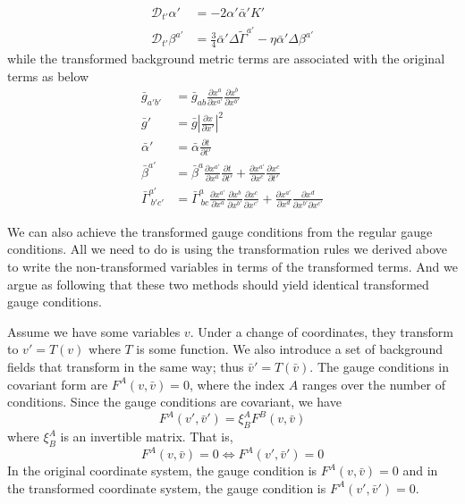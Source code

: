 \documentclass[letterpaper,nofootinbib,prd,amsmath,onecolumn]{revtex4-1}
\begin{document}
\begin{align*}
\mathscr{D}_{t'}\alpha' & = -2\alpha'{\bar \alpha}'K'\\
\mathscr{D}_{t'}\beta^{a'} & = \frac{3}{4}{\bar \alpha}'\Delta {\tilde \Gamma}^{a'} - \eta {\bar \alpha}'\Delta\beta^{a'}
\end{align*}
while the transformed background metric terms are associated with the original terms as below
\begin{align}
{\bar g}_{a'b'} & = {\bar g}_{ab}\frac{\partial x^{a}}{\partial x^{a'}}\frac{\partial x^{b}}{\partial x^{b'}}\\
{\bar g'} & = {\bar g}|\frac{\partial x}{\partial x'}|^{2}\\
{\bar \alpha}' & = {\bar \alpha}\frac{\partial t}{\partial t'}\\
{\bar \beta}^{a'} & = {\bar \beta}^{a}\frac{\partial x^{a'}}{\partial x^{a}}\frac{\partial t}{\partial t'} + \frac{\partial x^{a'}}{\partial x^{c}}\frac{\partial x^{c}}{\partial t'}\label{background shift}\\
{\bar \Gamma}^{a'}_{~b'c'} & = {\bar \Gamma}^{a}_{~bc}\frac{\partial x^{a'}}{\partial x^{a}}\frac{\partial x^{b}}{\partial x^{b'}}\frac{\partial x^{c}}{\partial x^{c'}} + \frac{\partial x^{a'}}{\partial x^{d}}\frac{\partial x^{d}}{\partial x^{b'}\partial x^{c'}}
\end{align}

We can also achieve the transformed gauge conditions from the regular gauge conditions. All we need to do is using the transformation rules we derived above to write the non-transformed variables in terms of the transformed terms. And we argue as following that these two methods should yield identical transformed gauge conditions. 

Assume we have some variables $v$. Under a change of coordinates, they transform to $v' = T(v)$ where $T$ is some function. We also introduce a 
set of background fields that transform in the same way; thus $\bar v' = T(\bar v)$. The gauge conditions in covariant form are $F^A(v,\bar v) = 0$, 
where the index $A$ ranges over the number of conditions. Since the gauge conditions are covariant, we have 
\begin{equation}
	F^A(v',\bar v') = \xi^A_B F^B(v,\bar v)
\end{equation}
where $\xi^A_B$ is an invertible matrix. That is, 
\begin{equation}\label{invariant equivalence}
	 F^A(v,\bar v) = 0 \Longleftrightarrow F^A(v',\bar v') = 0
\end{equation}
In the original coordinate system, the gauge condition is $F^A(v,\bar v) = 0$ and in the transformed coordinate system, the 
gauge condition is $F^A(v',\bar v') = 0$.
\end{document}
